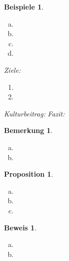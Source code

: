 \documentclass[paper = A4, fontsize=12pt, numbers=noendperiod, chapterprefix=true]{scrbook}
\theoremstyle{break}
\newtheorem{Bem}[Def]{Bemerkung}
\newtheorem{Prop}[Def]{Proposition}
\theoremstyle{nonumberbreak}
\newtheorem{bspe}{Beispiele}
\newtheorem{bew}{Beweis}
\theoremstyle{nonumberplain}
\begin{document}
\begin{bspe}\begin{enumerate}[a)]
\item
	
\item
	
\item
	
\item
	
\end{enumerate}\end{bspe}

\textit{Ziele:}\begin{enumerate}[1)]
\item
	
\item
	
\end{enumerate}
\textit{Kulturbeitrag:}
\textit{Fazit:}

\begin{Bem}\begin{enumerate}[a)]
\item
	
\item
	
\end{enumerate}\end{Bem}

\begin{Prop}
\begin{enumerate}[a)]
\item
	
\item
	
\item
	
\end{enumerate}\end{Prop}

\begin{bew}\begin{enumerate}[a)]
\item[b)]
	
\item[c)]
	
\end{enumerate}\end{bew}




\appendix
\end{document}
